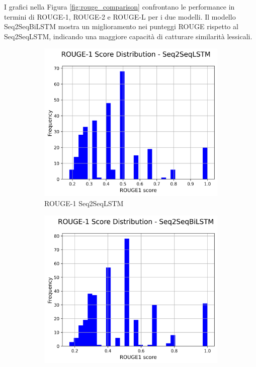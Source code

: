 \documentclass[a4paper, 12pt]{article}
\begin{document}
I grafici nella Figura \ref{fig:rouge_comparison} confrontano le performance in termini di ROUGE-1, ROUGE-2 e ROUGE-L per i due modelli. Il modello Seq2SeqBiLSTM mostra un miglioramento nei punteggi ROUGE rispetto al Seq2SeqLSTM, indicando una maggiore capacità di catturare similarità lessicali.
\begin{figure}[H]
    \centering
    \begin{subfigure}{0.32\textwidth}
        \centering
        \includegraphics[width=\textwidth]{media/Seq2SeqLSTM_rouge1_scores.png}
        \caption{ROUGE-1 Seq2SeqLSTM}
    \end{subfigure}
    \hfill
    \begin{subfigure}{0.32\textwidth}
        \centering
        \includegraphics[width=\textwidth]{media/Seq2SeqBiLSTM_rouge1_scores.png}

\end{subfigure}
\end{figure}
\end{document}
